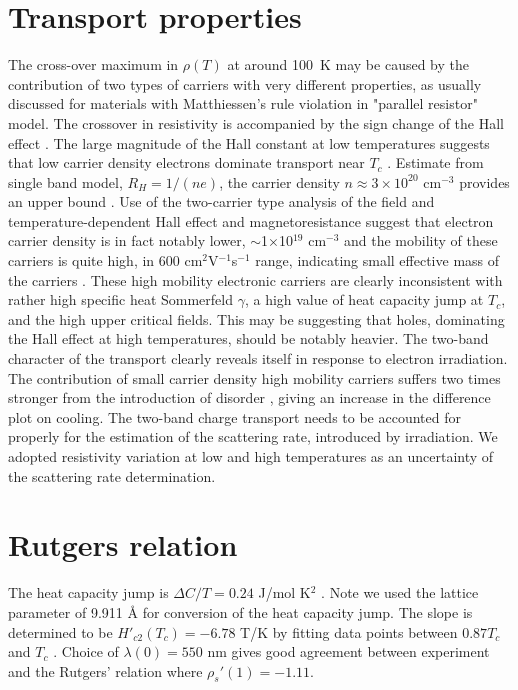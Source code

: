 \documentclass[aps,pra,reprint,superscriptaddress,floatfix]{revtex4-2}
\begin{document}
\section{Transport properties}
The cross-over maximum in $\rho (T)$ at around 100~K may be caused by the contribution of two types of carriers with very different properties, as usually discussed for materials with Matthiessen's rule violation \cite{Bass1972,Sondheimer1947,Allen1980} in "parallel resistor" model. The crossover in resistivity is accompanied by the sign change of the Hall effect \cite{Naren2008,Daou2016}. The large magnitude of the Hall constant at low temperatures suggests that low carrier density electrons dominate transport near $T_c$ \cite{Naren2008}. Estimate from single band model, $R_H=1/(ne)$, the carrier density $n\approx 3\times10^{20}$ cm$^{-3}$ provides an upper bound \cite{Naren2008}. Use of the two-carrier type analysis of the field and temperature-dependent Hall effect and magnetoresistance suggest that electron carrier density is in fact notably lower, $\sim$1$\times$10$^{19}$ cm$^{-3}$ and the mobility of these carriers is quite high, in 600 cm$^2$V$^{-1}$s$^{-1}$ range, indicating small effective mass of the carriers \cite{Daou2016}. These high mobility electronic carriers are clearly inconsistent with rather high specific heat Sommerfeld $\gamma$, a high value of heat capacity jump at $T_c$, and the high upper critical fields. This may be suggesting that holes, dominating the Hall effect at high temperatures, should be notably heavier. The two-band character of the transport clearly reveals itself in response to electron irradiation. The contribution of small carrier density high mobility carriers suffers two times stronger from the introduction of disorder \cite{TanatarJPCM}, giving an increase in the difference plot on cooling. The two-band charge transport needs to be accounted for properly for the estimation of the scattering rate, introduced by irradiation. We adopted resistivity variation at low and high temperatures as an uncertainty of the scattering rate determination. 

\section{Rutgers relation}

The heat capacity jump is $\Delta C/T=0.24$ J/mol K$^{2}$ \cite{Uhlarz2010,Naren2008}. Note we used the lattice parameter of 9.911 \AA \cite{Geller1962} for conversion of the heat capacity jump. The slope is determined to be $H'_{c2}(T_c) = -6.78$ T/K by fitting data points between $0.87T_c$ and $T_c$ \cite{Uhlarz2010}. Choice of $\lambda(0)=550$ nm gives good agreement between experiment and the Rutgers' relation where $\rho_s'(1)=-1.11$.
\end{document}
